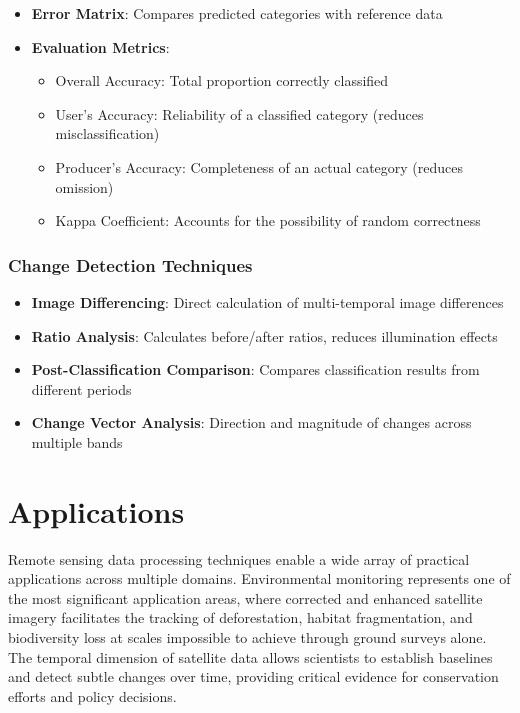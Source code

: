 \documentclass[
  letterpaper,
]{scrbook}
\providecommand{\tightlist}{%
  \setlength{\itemsep}{0pt}\setlength{\parskip}{0pt}}\usepackage{longtable,booktabs,array}
\begin{document}
\begin{itemize}
\tightlist
\item
  \textbf{Error Matrix}: Compares predicted categories with reference
  data
\item
  \textbf{Evaluation Metrics}:

  \begin{itemize}
  \tightlist
  \item
    Overall Accuracy: Total proportion correctly classified
  \item
    User's Accuracy: Reliability of a classified category (reduces
    misclassification)
  \item
    Producer's Accuracy: Completeness of an actual category (reduces
    omission)
  \item
    Kappa Coefficient: Accounts for the possibility of random
    correctness
  \end{itemize}
\end{itemize}

\subsection{Change Detection
Techniques}\label{change-detection-techniques}

\begin{itemize}
\tightlist
\item
  \textbf{Image Differencing}: Direct calculation of multi-temporal
  image differences
\item
  \textbf{Ratio Analysis}: Calculates before/after ratios, reduces
  illumination effects
\item
  \textbf{Post-Classification Comparison}: Compares classification
  results from different periods
\item
  \textbf{Change Vector Analysis}: Direction and magnitude of changes
  across multiple bands
\end{itemize}


\chapter{Applications}\label{applications-1}

Remote sensing data processing techniques enable a wide array of
practical applications across multiple domains. Environmental monitoring
represents one of the most significant application areas, where
corrected and enhanced satellite imagery facilitates the tracking of
deforestation, habitat fragmentation, and biodiversity loss at scales
impossible to achieve through ground surveys alone. The temporal
dimension of satellite data allows scientists to establish baselines and
detect subtle changes over time, providing critical evidence for
conservation efforts and policy decisions.
\end{document}
